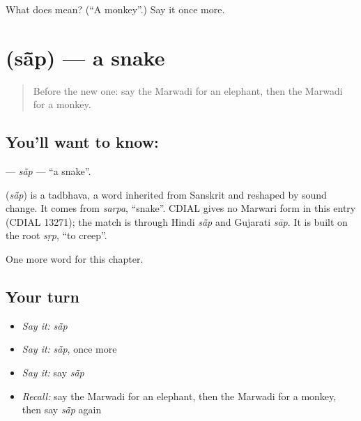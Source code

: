 \begin{tcolorbox}[breakable,colback=teal!4,colframe=teal!35!black,title={Before you move on}]
What does  mean? (\textquotedblleft{}A monkey\textquotedblright{}.) Say it once more.
\end{tcolorbox}
\section[\texorpdfstring{\mw{सांप} (sā̃p)}{सांप (sā̃p)}]{ (sā̃p) — a snake}

\label{lesson:MW-C72-sap}



\begin{quote}
Before the new one: say the Marwadi for an elephant, then the Marwadi for a monkey.
\end{quote}

\subsection*{You'll want to know: }
\textbf{} — \emph{sā̃p} — \textquotedblleft{}a snake\textquotedblright{}.

\begin{cousinweb}
\textbf{} (\emph{sā̃p}) is a tadbhava, a word inherited from Sanskrit and reshaped by sound change. It comes from \emph{sarpa}, \textquotedblleft{}snake\textquotedblright{}. CDIAL gives no Marwari form in this entry (CDIAL 13271); the match is through Hindi \emph{sā̃p} and Gujarati \emph{sāp}. It is built on the root \emph{sṛp}, \textquotedblleft{}to creep\textquotedblright{}.
\end{cousinweb}

\begin{grammarlens}[title={What you've built}]
One more word for this chapter.
\end{grammarlens}

\subsection*{Your turn}
\begin{itemize}
\raggedright
  \item \emph{Say it:} \emph{sā̃p}
  \item \emph{Say it:} \emph{sā̃p}, once more
  \item \emph{Say it:} say \emph{sā̃p}
  \item \emph{Recall:} say the Marwadi for an elephant, then the Marwadi for a monkey, then say \emph{sā̃p} again
\end{itemize}

